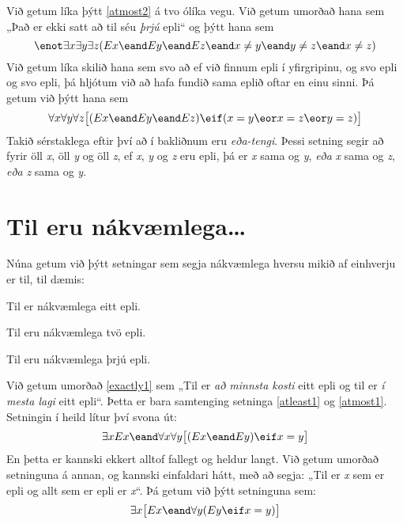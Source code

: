 Við getum líka þýtt \ref{atmost2} á tvo ólíka vegu. Við getum umorðað hana sem „Það er ekki satt að til séu \emph{þrjú} epli“ og þýtt hana sem $$\enot \exists x \exists y\exists z(Ex \eand Ey \eand Ez \eand x \neq y \eand y \neq z \eand x \neq z)$$ Við getum líka skilið hana sem svo að ef við finnum epli í yfirgripinu, og svo epli og svo epli, þá hljótum við að hafa fundið sama eplið oftar en einu sinni. Þá getum við þýtt hana sem $$\forall x\forall y\forall z\bigl[(Ex \eand Ey \eand Ez) \eif (x=y \eor x=z \eor y=z)\bigr]$$Takið sérstaklega eftir því að í bakliðnum eru \emph{eða-tengi}. Þessi setning segir að fyrir öll \emph{x}, öll \emph{y} og öll \emph{z}, ef \emph{x}, \emph{y} og \emph{z} eru epli, þá er \emph{x} sama og \emph{y}, \emph{eða} \emph{x} sama og \emph{z}, \emph{eða} \emph{z} sama og \emph{y}. 

\section{Til eru nákvæmlega\ldots}
Núna getum við þýtt setningar sem segja nákvæmlega hversu mikið af einhverju er til, til dæmis:
\begin{earg}
\item[\ex{exactly1}] Til er nákvæmlega eitt epli.
\item[\ex{exactly2}] Til eru nákvæmlega tvö epli.
\item[\ex{exactly3}] Til eru nákvæmlega þrjú epli.
\end{earg}
Við getum umorðað \ref{exactly1} sem „Til er \emph{að minnsta kosti} eitt epli og til er \emph{í mesta lagi} eitt epli“. Þetta er bara samtenging setninga \ref{atleast1} og \ref{atmost1}. Setningin í heild lítur því svona út: $$\exists x Ex \eand \forall x\forall y\bigl[(Ex \eand Ey) \eif x=y\bigr]$$En þetta er kannski ekkert alltof fallegt og heldur langt. Við getum umorðað setninguna á annan, og kannski einfaldari hátt, með að segja: „Til er \emph{x} sem er epli og allt sem er epli er \emph{x}“. Þá getum við þýtt setninguna sem:$$\exists x\bigl[Ex \eand \forall y(Ey \eif x= y)\bigr]$$

